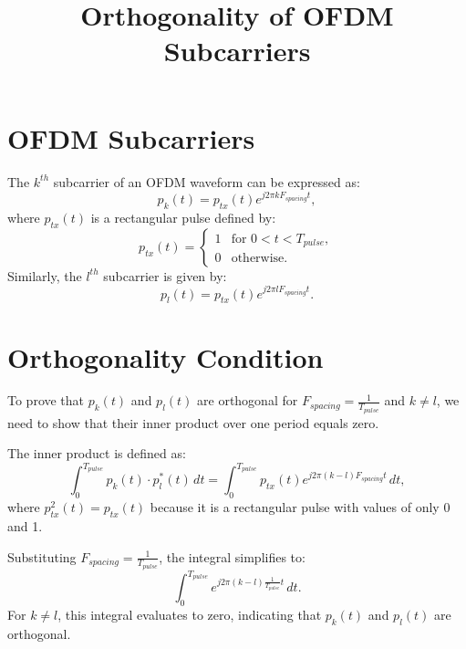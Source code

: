 \documentclass{article}
\title{Orthogonality of OFDM Subcarriers}
\author{}
\date{}
\begin{document}
\maketitle
\section*{OFDM Subcarriers}
The $k^{th}$ subcarrier of an OFDM waveform can be expressed as:
\begin{equation}
    p_k(t) = p_{tx}(t) e^{j 2 \pi k F_{spacing} t},
\end{equation}
where $p_{tx}(t)$ is a rectangular pulse defined by:
\begin{equation}
    p_{tx}(t) = 
    \begin{cases} 
        1 & \text{for } 0 < t < T_{pulse}, \\
        0 & \text{otherwise}.
    \end{cases}
\end{equation}
Similarly, the $l^{th}$ subcarrier is given by:
\begin{equation}
    p_l(t) = p_{tx}(t) e^{j 2 \pi l F_{spacing} t}.
\end{equation}

\section*{Orthogonality Condition}
To prove that $p_k(t)$ and $p_l(t)$ are orthogonal for $F_{spacing} = \frac{1}{T_{pulse}}$ and $k \neq l$, we need to show that their inner product over one period equals zero.

The inner product is defined as:
\begin{equation}
    \int_0^{T_{pulse}} p_k(t) \cdot p_l^*(t) \, dt = \int_0^{T_{pulse}} p_{tx}(t) e^{j 2 \pi (k-l) F_{spacing} t} \, dt,
\end{equation}
where $p_{tx}^2(t) = p_{tx}(t)$ because it is a rectangular pulse with values of only 0 and 1.

Substituting $F_{spacing} = \frac{1}{T_{pulse}}$, the integral simplifies to:
\begin{equation}
    \int_0^{T_{pulse}} e^{j 2 \pi (k-l) \frac{1}{T_{pulse}} t} \, dt.
\end{equation}
For $k \neq l$, this integral evaluates to zero, indicating that $p_k(t)$ and $p_l(t)$ are orthogonal.
\end{document}
